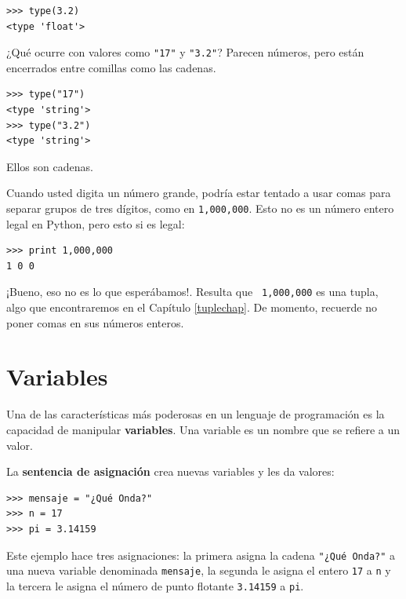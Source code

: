 
\beforeverb
\begin{verbatim}
>>> type(3.2)
<type 'float'>
\end{verbatim}
\afterverb
%
¿Qué ocurre con valores como {\verb+"17"+} y {\verb+"3.2"+}?
Parecen números, pero están encerrados entre comillas como 
las cadenas.

\beforeverb
\begin{verbatim}
>>> type("17")
<type 'string'>
>>> type("3.2")
<type 'string'>
\end{verbatim}
\afterverb
%
Ellos son cadenas.

Cuando usted digita un número grande, podría estar tentado a usar
comas para separar grupos de tres dígitos, como en  \texttt{1,000,000}.  
Esto no es un número entero legal en Python, pero esto si es legal:

\beforeverb
\begin{verbatim}
>>> print 1,000,000
1 0 0
\end{verbatim}
\afterverb
%
¡Bueno, eso no es lo que esperábamos!.  Resulta que  {\tt
1,000,000} es una tupla, algo que encontraremos en el 
Capítulo \ref{tuplechap}.  De momento, recuerde no poner comas en sus 
números enteros.


\section{Variables}

Una de las características más poderosas en un lenguaje de programación
es la capacidad de manipular  {\bf variables}.  Una variable es un nombre
que se refiere a un valor.

La  {\bf sentencia de asignación} crea nuevas variables y les da valores:

\beforeverb
\begin{verbatim}
>>> mensaje = "¿Qué Onda?"
>>> n = 17
>>> pi = 3.14159
\end{verbatim}
\afterverb
%
Este ejemplo hace tres asignaciones: la primera asigna la cadena
{\verb+"¿Qué Onda?"+} a una nueva variable denominada \texttt{mensaje}, 
la segunda le asigna el entero \texttt{17} a \texttt{n} y la tercera le
asigna el número de punto flotante \texttt{3.14159} a \texttt{pi}.


